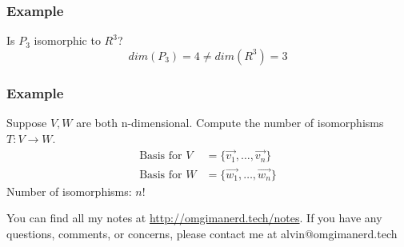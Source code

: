 \documentclass{math}
\begin{document}
\subsubsection*{Example}
Is \( P_3 \) isomorphic to \( R^3 \)?
\[ dim(P_3) = 4 \ne dim(R^3) = 3 \]

\subsubsection*{Example}
Suppose \( V,W \) are both n-dimensional. Compute the number of isomorphisms
\( T:V\to W \).
\begin{align*}
  \text{Basis for } V &= \{\vec{v_1},\dots,\vec{v_n}\} \\
  \text{Basis for } W &= \{\vec{w_1},\dots,\vec{w_n}\}
\end{align*}
Number of isomorphisms: \( n! \)

\begin{center}
  You can find all my notes at \url{http://omgimanerd.tech/notes}. If you have
  any questions, comments, or concerns, please contact me at
  alvin@omgimanerd.tech
\end{center}
\end{document}
